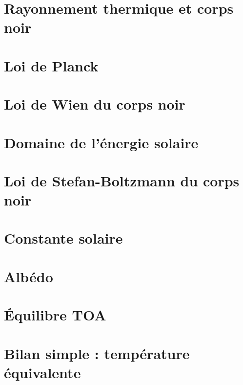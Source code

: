 \documentclass[
        a4paper,
        DIV16,
        10pt,
        cleardoublepage=empty,
        twoside=yes,
        BCOR=8.25mm
        ]{scrbook}
\begin{document}
\newpage
\section{Rayonnement thermique et corps noir}



\newpage
\section{Loi de Planck}


\newpage
\section{Loi de Wien du corps noir}


\newpage
\section{Domaine de l'énergie solaire}


\newpage
\section{Loi de Stefan-Boltzmann du corps noir}


%

\newpage
\section{Constante solaire}



\newpage 
\section{Albédo} 


\newpage
\section{\'Equilibre TOA}


\newpage
\section{Bilan simple : température équivalente}

\end{document}
